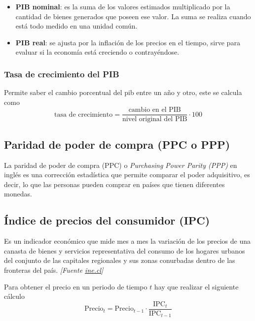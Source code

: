 \begin{itemize}
    \item \textbf{PIB nominal}: es la suma de los valores estimados multiplicado por la cantidad de bienes generados que poseen ese valor. La suma se realiza cuando está todo medido en una unidad común.
    \item \textbf{PIB real}: se ajusta por la inflación de los precios en el tiempo, sirve para evaluar si la economía está creciendo o contrayéndose.
\end{itemize}

\subsubsection{Tasa de crecimiento del PIB}
Permite saber el cambio porcentual del pib entre un año y otro, este se calcula como
\[\text{tasa de crecimiento} = \frac{\text{cambio en el PIB}}{\text{nivel original del PIB}}\cdot100\]


\subsection{Paridad de poder de compra (PPC o PPP)}
La paridad de poder de compra (PPC) o \textit{Purchasing Power Parity (PPP)} en inglés es una corrección estadística que permite comparar el poder adquisitivo, es decir, lo que las personas pueden comprar en países que tienen diferentes monedas.

\subsection{Índice de precios del consumidor (IPC)}
Es un indicador económico que mide mes a mes la variación de los precios de una canasta de bienes y servicios representativa del consumo de los hogares urbanos del conjunto de las capitales regionales y sus zonas conurbadas dentro de las fronteras del país. \textit{[Fuente \href{www.ine.cl}{ine.cl}]}

Para obtener el precio en un periodo de tiempo $t$ hay que realizar el siguiente cálculo
\[\text{Precio}_t = \text{Precio}_{t-1}\cdot\frac{\text{IPC}_t}{\text{IPC}_{t-1}}\]
\newpage